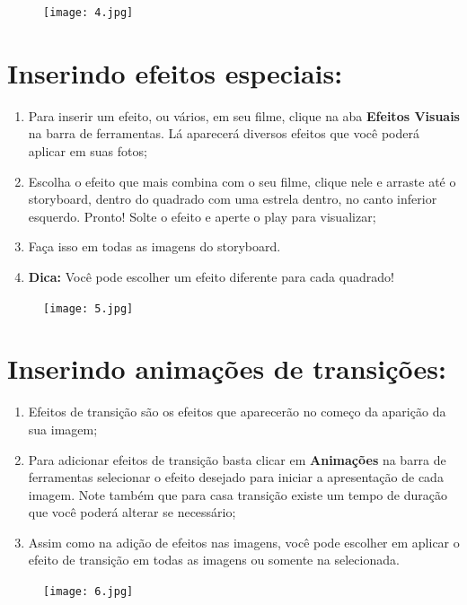\documentclass{article}
\begin{document}
{\begin{figure}[h!]
\centering
\texttt{[image: 4.jpg]}
\end{figure}

\newpage

\section{Inserindo efeitos especiais:}
\begin{enumerate}
\item Para inserir um efeito, ou vários, em seu filme, clique na aba \textbf{Efeitos Visuais} na barra de ferramentas. Lá aparecerá diversos efeitos que você poderá aplicar em suas fotos;
\item Escolha o efeito que mais combina com o seu filme, clique nele e arraste até o storyboard, dentro do quadrado com uma estrela dentro, no canto inferior
esquerdo. Pronto! Solte o efeito e aperte o play para visualizar;
\item Faça isso em todas as imagens do storyboard. 
\item \textbf{Dica:} Você pode escolher um efeito diferente para cada quadrado!
\end{enumerate}

\begin{figure}[h!]
\centering
\texttt{[image: 5.jpg]}
\end{figure}

\newpage

\section{Inserindo animações de transições:}
\begin{enumerate}
\item Efeitos de transição são os efeitos que aparecerão no começo da aparição da sua imagem;
\item Para adicionar efeitos de transição basta clicar em \textbf{Animações} na barra de ferramentas selecionar o efeito desejado para iniciar a apresentação de cada imagem. Note também que para casa transição existe um tempo de duração que você poderá alterar se necessário;
\item Assim como na adição de efeitos nas imagens, você pode escolher em aplicar o efeito de transição em todas as imagens ou somente na selecionada.
\end{enumerate}

\begin{figure}[h!]
\centering
\texttt{[image: 6.jpg]}
\end{figure}

}
\end{document}
